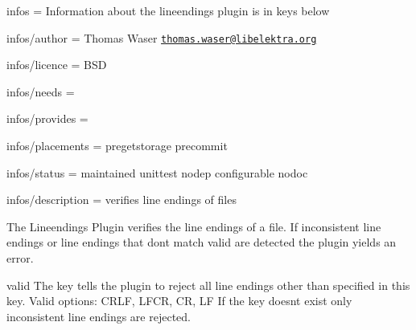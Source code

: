 
\begin{DoxyItemize}
\item infos = Information about the lineendings plugin is in keys below
\item infos/author = Thomas Waser \href{mailto:thomas.waser@libelektra.org}{\tt thomas.\+waser@libelektra.\+org}
\item infos/licence = B\+SD
\item infos/needs =
\item infos/provides =
\item infos/placements = pregetstorage precommit
\item infos/status = maintained unittest nodep configurable nodoc
\item infos/description = verifies line endings of files
\end{DoxyItemize}

The Lineendings Plugin verifies the line endings of a file. If inconsistent line endings or line endings that don\textquotesingle{}t match {\ttfamily valid} are detected the plugin yields an error.

{\ttfamily valid} The key tells the plugin to reject all line endings other than specified in this key. Valid options\+: C\+R\+LF, L\+F\+CR, CR, LF If the key doesn\textquotesingle{}t exist only inconsistent line endings are rejected. 